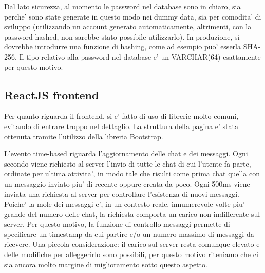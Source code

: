 \documentclass[10pt]{article}
\begin{document}
Dal lato sicurezza, al momento le password nel database sono in chiaro, sia perche' sono state generate in questo modo nei dummy data, sia per comodita' di sviluppo (utilizzando un account generato automaticamente, altrimenti, con la password hashed, non sarebbe stato possibile utilizzarlo). In produzione, si dovrebbe introdurre una funzione di hashing, come ad esempio puo' esserla SHA-256. Il tipo relativo alla password nel database e' un VARCHAR(64) esattamente per questo motivo.

\subsection{ReactJS frontend}
Per quanto riguarda il frontend, si e' fatto di uso di librerie molto comuni, evitando di entrare troppo nel dettaglio.
La struttura della pagina e' stata ottenuta tramite l'utilizzo della libreria Bootstrap.

L'evento time-based riguarda l'aggiornamento delle chat e dei messaggi.
Ogni secondo viene richiesto al server l'invio di tutte le chat di cui l'utente fa parte, ordinate per ultima attivita', in modo tale che risulti come prima chat quella con un messaggio inviato piu' di recente oppure creata da poco.
Ogni 500ms viene inviata una richiesta al server per controllare l'esistenza di nuovi messaggi. Poiche' la mole dei messaggi e', in un contesto reale, innumerevole volte piu' grande del numero delle chat, la richiesta comporta un carico non indifferente sul server. Per questo motivo, la funzione di controllo messaggi permette di specificare un timestamp da cui partire e/o un numero massimo di messaggi da ricevere.
Una piccola considerazione: il carico sul server resta comunque elevato e delle modifiche per alleggerirlo sono possibili, per questo motivo riteniamo che ci sia ancora molto margine di miglioramento sotto questo aspetto.
\end{document}

